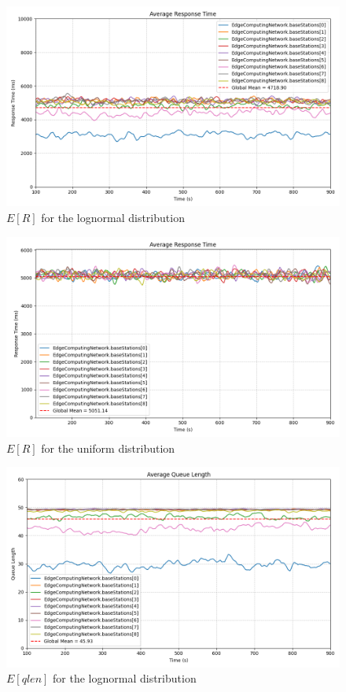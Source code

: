 \documentclass{report}
\begin{document}
\begin{figure}[H]
    \centering
    \includegraphics[width=\textwidth]{img/plots/log_1e4_A/resptime.png}
    \caption{$E[R]$ for the lognormal distribution}
\end{figure}

\begin{figure}[H]
    \centering
    \includegraphics[width=\textwidth]{img/plots/uni_1e4_A/resptime.png}
    \caption{$E[R]$ for the uniform distribution}
\end{figure}

\begin{figure}[H]
    \centering
    \includegraphics[width=\textwidth]{img/plots/log_1e4_A/qlen.png}
    \caption{$E[qlen]$ for the lognormal distribution}
\end{figure}
\end{document}

